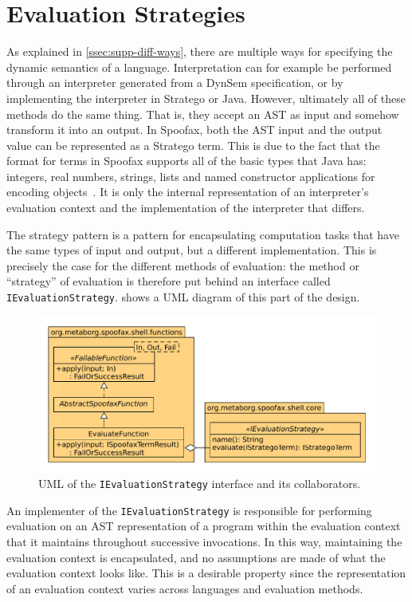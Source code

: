 \section{Evaluation Strategies}
\label{sec:eval-strat}
As explained in \cref{ssec:supp-diff-ways}, there are multiple ways for
specifying the dynamic semantics of a language. Interpretation can for example
be performed through an interpreter generated from a DynSem specification, or by
implementing the interpreter in Stratego or Java. However, ultimately all of
these methods do the same thing. That is, they accept an AST as input and
somehow transform it into an output. In Spoofax, both the AST input and the
output value can be represented as a Stratego term. This is due to the fact that
the format for terms in Spoofax supports all of the basic types that Java has:
integers, real numbers, strings, lists and named constructor applications for
encoding objects~\cite{Brand00}. It is only the internal representation of an
interpreter's evaluation context and the implementation of the interpreter that
differs.

The strategy pattern is a pattern for encapsulating computation tasks that have
the same types of input and output, but a different implementation. This is
precisely the case for the different methods of evaluation: the method or
``strategy'' of evaluation is therefore put behind an interface called
\texttt{IEvaluationStrategy}.  shows a UML diagram
of this part of the design.

\begin{figure}[t]
  \centering
  \includegraphics[width=\textwidth]{uml-eval-strat}
  \caption{UML of the \texttt{IEvaluationStrategy} interface and its
    collaborators.}
  \label{fig:uml-eval-strat}
\end{figure}

An implementer of the \texttt{IEvaluationStrategy} is responsible for performing
evaluation on an AST representation of a program within the evaluation context
that it maintains throughout successive invocations. In this way, maintaining
the evaluation context is encapsulated, and no assumptions are made of what the
evaluation context looks like. This is a desirable property since the
representation of an evaluation context varies across languages and evaluation
methods.

